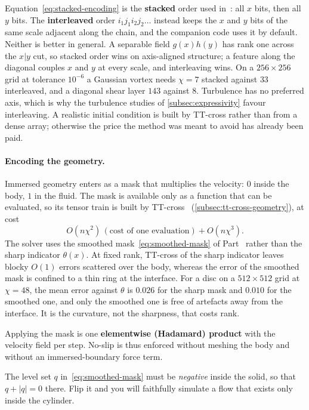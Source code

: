 Equation~\eqref{eq:stacked-encoding} is the \textbf{stacked} order used
in~\cite{Peddinti2024}: all $x$ bits, then all $y$ bits. The
\textbf{interleaved} order $i_1 j_1 i_2 j_2\dots$ instead keeps the $x$ and $y$
bits of the same scale adjacent along the chain, and the companion code uses it
by default. Neither is better in general. A separable field $g(x)h(y)$ has rank
one across the $x|y$ cut, so stacked order wins on axis-aligned structure; a
feature along the diagonal couples $x$ and $y$ at every scale, and interleaving
wins. On a $256\times256$ grid at tolerance $10^{-6}$ a Gaussian vortex needs
$\chi = 7$ stacked against $33$ interleaved, and a diagonal shear layer $143$
against $8$. Turbulence has no preferred axis, which is why the turbulence
studies of \cref{subsec:expressivity} favour interleaving. A realistic initial
condition is built by TT-cross rather than from a dense array; otherwise the
price the method was meant to avoid has already been paid.

\paragraph{Encoding the geometry.}
Immersed geometry enters as a mask that multiplies the velocity: $0$ inside the
body, $1$ in the fluid. The mask is available only as a function that can be
evaluated, so its tensor train is built by TT-cross~\cite{Oseledets2010}
(\cref{subsec:tt-cross-geometry}), at cost
\begin{equation}
  O(n\chi^2)\,(\text{cost of one evaluation}) + O(n\chi^3).
\end{equation}
The solver uses the smoothed mask~\eqref{eq:smoothed-mask} of
Part~ rather than the sharp indicator $\theta(x)$. At fixed rank,
TT-cross of the sharp indicator leaves blocky $O(1)$ errors scattered over the
body, whereas the error of the smoothed mask is confined to a thin ring at the
interface. For a disc on a $512\times512$ grid at $\chi = 48$, the mean error
against $\theta$ is $0.026$ for the sharp mask and $0.010$ for the smoothed one,
and only the smoothed one is free of artefacts away from the interface. It is
the curvature, not the sharpness, that costs rank.

Applying the mask is one \textbf{elementwise (Hadamard) product} with the
velocity field per step. No-slip is thus enforced without meshing the body and
without an immersed-boundary force term.

\begin{remark}
  The level set $q$ in~\eqref{eq:smoothed-mask} must be \emph{negative} inside
  the solid, so that $q + |q| = 0$ there. Flip it and you will faithfully
  simulate a flow that exists only inside the cylinder.
\end{remark}

